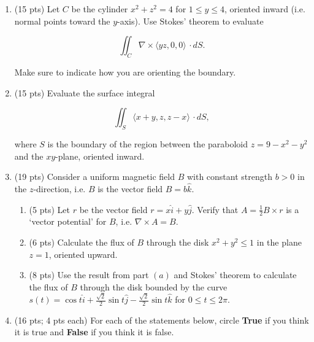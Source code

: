 \documentclass[12 pt]{report}
\begin{document}
\newpage
\begin{enumerate}

\item (15 pts) Let $C$ be the cylinder $x^2+z^2 = 4$ for $1 \leq y \leq 4$, oriented inward (i.e. normal points toward the $y$-axis). Use Stokes' theorem to evaluate

\[
\iint_C \nabla \times \langle yz, 0, 0 \rangle \, \cdot dS.
\]

Make sure to indicate how you are orienting the boundary. 

\vfill

\newpage \item (15 pts) Evaluate the surface integral

\[
\iint_S \langle x+y, z, z-x \rangle \, \cdot dS,
\]

where $S$ is the boundary of the region between the paraboloid $z = 9-x^2-y^2$ and the $xy$-plane, oriented inward.

\vfill

\newpage \item (19 pts) Consider a uniform magnetic field $B$ with constant strength $b > 0$ in the $z$-direction, i.e. $B$ is the vector field $B = b \hat{k}$.

\begin{enumerate} \item (5 pts) Let $r$ be the vector field $r = x \hat{i} + y \hat{j}$. Verify that $A = \frac{1}{2} B \times r$ is a `vector potential' for $B$, i.e. $\nabla \times A = B$. 

\vfill

\item (6 pts) Calculate the flux of $B$ through the disk $x^2 + y^2 \leq 1$ in the plane $z = 1$, oriented upward. 

\vspace{4cm}

\item (8 pts) Use the result from part $(a)$ and Stokes' theorem to calculate the flux of $B$ through the disk bounded by the curve $s(t) = \cos t \hat{i} + \frac{\sqrt{2}}{2} \sin t \hat{j} - \frac{\sqrt{2}}{2} \sin t \hat{k}$ for $0 \leq t \leq 2\pi$. 

\vfill

\end{enumerate}

\newpage \item (16 pts; 4 pts each) For each of the statements below, circle \textbf{True} if you think it is true and \textbf{False} if you think it is false. 


\end{enumerate}
\end{document}
